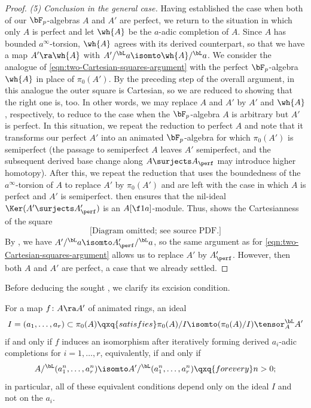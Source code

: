 \begin{proof}
\emph{(5) Conclusion in the general case.}  Having established the case when both of our $\bF_p$-algebras $A$ and $A'$ are perfect, we return to the situation in which only $A$ is perfect and let $\wh{A}$ be the $a$-adic completion of $A$. Since $A$ has bounded $a^\infty$-torsion, $\wh{A}$ agrees with its derived counterpart, so that we have a map $A' \ra \wh{A}$ with $A'/^\bL a \isomto \wh{A}/^\bL a$. We consider the analogue of \eqref{eqn:two-Cartesian-squares-argument} with the perfect $\bF_p$-algebra $\wh{A}$ in place of $\pi_0(A')$. By the preceding step of the overall argument, in this analogue the outer square is Cartesian, so we are reduced to showing that the right one is, too. In other words, we may replace $A$ and $A'$ by $A'$ and $\wh{A}$, respectively, to reduce to the case when the $\bF_p$-algebra $A$ is arbitrary but $A'$ is perfect. In this situation, we repeat the reduction to perfect $A$ and note that it transforms our perfect $A'$ into an animated $\bF_p$-algebra for which $\pi_0(A')$ is semiperfect (the passage to semiperfect $A$ leaves $A'$ semiperfect, and the subsequent derived base change along $A\surjects A_\perf$ may introduce higher homotopy). After this, we repeat the reduction that uses the boundedness of the $a^\infty$-torsion of $A$ to replace $A'$ by $\pi_0(A')$ and are left with the case in which $A$ is perfect and $A'$ is semiperfect.  then ensures that the nil-ideal $\Ker(A' \surjects A'_\perf)$ is an $A[\f 1a]$-module. Thus,  shows the Cartesianness of the square
\[\text{[Diagram omitted; see source PDF.]}
\]
By , we have $A'/^\bL a \isomto A'_\perf/^\bL a$, so the same argument as for \eqref{eqn:two-Cartesian-squares-argument} allows us to replace $A'$ by $A'_\perf$. However, then both $A$ and $A'$ are perfect, a case that we already settled. %
\end{proof}





Before deducing the sought , we clarify its excision condition. %






\blem \label{comp-explain}
For a map $f\colon A \ra A'$ of animated rings, an ideal
\[
I = (a_1, \dotsc, a_r) \subset \pi_0(A) \qxq{satisfies} \pi_0(A)/I \isomto (\pi_0(A)/I) \tensor^\bL_A A'
\]
if and only if $f$ induces an isomorphism after iteratively forming derived $a_i$-adic completions for $i = 1,\dotsc, r$, equivalently, if and only if
\[
A/^\bL(a_1^n, \dotsc, a_r^n) \isomto A'/^\bL(a_1^n, \dotsc, a_r^n) \qxq{for every} n > 0;
\]
in particular, all of these equivalent conditions depend only on the ideal $I$ and not on the $a_i$.
\elem

